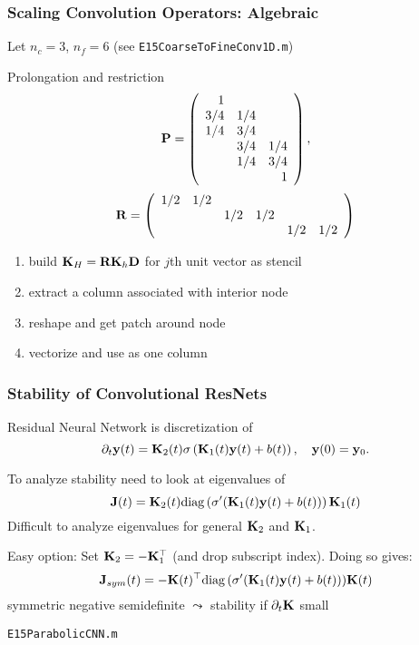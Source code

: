 \documentclass[12pt,fleqn,handout]{beamer}
\begin{document}
 \begin{frame}
 	\frametitle{Scaling Convolution Operators: Algebraic}

 Let $n_c=3$, $n_f=6$ (see \texttt{E15CoarseToFineConv1D.m})

 	Prolongation and restriction
 	$$
 		{\bf P} = \left(
 			\begin{array}{rrr}
 				1 &  \\
 				3/4 & 1/4 & \\
 				1/4 & 3/4 & \\
 				    & 3/4 & 1/4\\
 					& 1/4 & 3/4\\
					&    & 1
 			\end{array}
 		\right),
 	$$
	\pause
	$$
		{\bf R} = \left(
			\begin{array}{rrrrrr}
				1/2 & 1/2 \\
				    &     & 1/2  & 1/2 \\
					&     &     &     & 1/2 & 1/2 \\
			\end{array}
		\right)
	$$
	\pause
	\begin{enumerate}
		\item build ${\bf K}_H = {\bf R} {\bf K}_h {\bf D}$ for $j$th unit vector as stencil
		\item extract a column associated with interior node
		\item reshape and get patch around node
		\item vectorize and use as one column
	\end{enumerate}


 	\begin{center}
 		
 	\end{center}

 \end{frame}

\begin{frame}
	\frametitle{Stability of Convolutional ResNets}
	
	Residual Neural Network is discretization of 
	$$
		\partial_t {\bf y}(t) = {\bf K}_2(t) \sigma\left({\bf K}_1(t) {\bf y}(t) + b(t)\right), \quad {\bf y}(0)= {\bf y}_0.
	$$
	\pause
	
	To analyze stability need to look at eigenvalues of 
	$$
		{\bf J}(t) = {\bf K}_2(t) {\rm diag}\left(\sigma'({\bf K}_1(t) {\bf y}(t) + b(t))\right) {\bf K}_1(t)
	$$
	Difficult to analyze eigenvalues for general ${\bf K}_2$ and ${\bf K}_1$. 
	
	\pause
	
	Easy option: Set ${\bf K}_2 = - {\bf K}_1^\top$ (and drop subscript index). Doing so gives:
	$$
		{\bf J}_{sym}(t)=  - {\bf K}(t)^\top {{\rm diag}\left(\sigma'({\bf K}_1(t) {\bf y}(t) + b(t))\right)} {\bf K}(t)
	$$
	symmetric negative semidefinite $\leadsto$ stability if $\partial_t {\bf K}$ small
	
	\begin{center}
		\texttt{E15ParabolicCNN.m}
	\end{center}
\end{frame}
\end{document}
